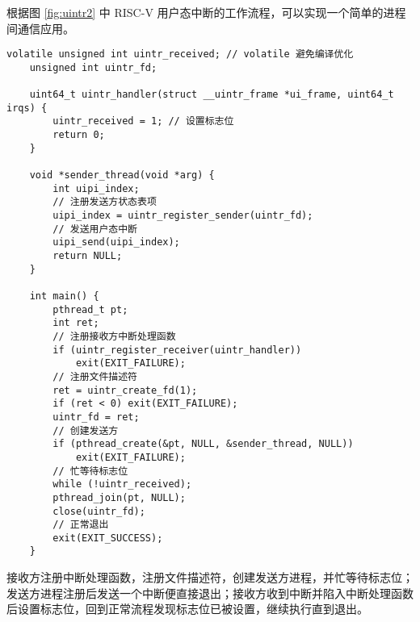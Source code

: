 根据图 \ref{fig:uintr2} 中 RISC-V 用户态中断的工作流程，可以实现一个简单的进程间通信应用。

\begin{lstlisting}[style=CStyle]
    volatile unsigned int uintr_received; // volatile 避免编译优化
    unsigned int uintr_fd;

    uint64_t uintr_handler(struct __uintr_frame *ui_frame, uint64_t irqs) {
        uintr_received = 1; // 设置标志位
        return 0;
    }

    void *sender_thread(void *arg) {
        int uipi_index;
        // 注册发送方状态表项
        uipi_index = uintr_register_sender(uintr_fd);
        // 发送用户态中断
        uipi_send(uipi_index);
        return NULL;
    }

    int main() {
        pthread_t pt;
        int ret;
        // 注册接收方中断处理函数
        if (uintr_register_receiver(uintr_handler))
            exit(EXIT_FAILURE);
        // 注册文件描述符
        ret = uintr_create_fd(1);
        if (ret < 0) exit(EXIT_FAILURE);
        uintr_fd = ret;
        // 创建发送方
        if (pthread_create(&pt, NULL, &sender_thread, NULL))
            exit(EXIT_FAILURE);
        // 忙等待标志位
        while (!uintr_received);
        pthread_join(pt, NULL);
        close(uintr_fd);
        // 正常退出
        exit(EXIT_SUCCESS);
    }
\end{lstlisting}

接收方注册中断处理函数，注册文件描述符，创建发送方进程，并忙等待标志位；发送方进程注册后发送一个中断便直接退出；接收方收到中断并陷入中断处理函数后设置标志位，回到正常流程发现标志位已被设置，继续执行直到退出。